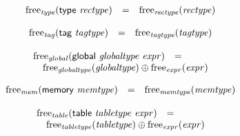 \vspace{1ex}

\vspace{1ex}

\vspace{1ex}

$$
\begin{array}[t]{@{}lcl@{}l@{}}
{\mathrm{free}}_{\mathit{type}}(\mathsf{type}~{\mathit{rectype}}) & = & {\mathrm{free}}_{\mathit{rectype}}({\mathit{rectype}}) \\
\end{array}
$$

$$
\begin{array}[t]{@{}lcl@{}l@{}}
{\mathrm{free}}_{\mathit{tag}}(\mathsf{tag}~{\mathit{tagtype}}) & = & {\mathrm{free}}_{\mathit{tagtype}}({\mathit{tagtype}}) \\
\end{array}
$$

$$
\begin{array}[t]{@{}lcl@{}l@{}}
{\mathrm{free}}_{\mathit{global}}(\mathsf{global}~{\mathit{globaltype}}~{\mathit{expr}}) & = & & \\
 \multicolumn{4}{@{}l@{}}{\quad
\begin{array}[t]{@{}l@{}}
{\mathrm{free}}_{\mathit{globaltype}}({\mathit{globaltype}}) \oplus {\mathrm{free}}_{\mathit{expr}}({\mathit{expr}}) \\
\end{array}
} \\
\end{array}
$$

$$
\begin{array}[t]{@{}lcl@{}l@{}}
{\mathrm{free}}_{\mathit{mem}}(\mathsf{memory}~{\mathit{memtype}}) & = & {\mathrm{free}}_{\mathit{memtype}}({\mathit{memtype}}) \\
\end{array}
$$

$$
\begin{array}[t]{@{}lcl@{}l@{}}
{\mathrm{free}}_{\mathit{table}}(\mathsf{table}~{\mathit{tabletype}}~{\mathit{expr}}) & = & & \\
 \multicolumn{4}{@{}l@{}}{\quad
\begin{array}[t]{@{}l@{}}
{\mathrm{free}}_{\mathit{tabletype}}({\mathit{tabletype}}) \oplus {\mathrm{free}}_{\mathit{expr}}({\mathit{expr}}) \\
\end{array}
} \\
\end{array}
$$

